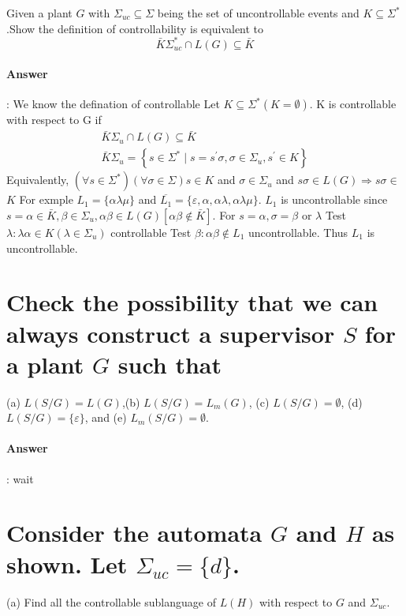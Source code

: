 \documentclass{article}
\begin{document}
Given a plant $G$ with $\Sigma_{u c} \subseteq \Sigma$ being the set of uncontrollable events and $K \subseteq \Sigma^*$.Show the definition of controllability is equivalent to
$$
\bar{K} \Sigma_{u c}^* \cap L(G) \subseteq \bar{K}
$$

\paragraph{Answer}:
We know the defination of controllable Let $K \subseteq \Sigma^*(K=\emptyset)$. K is controllable with respect to $\mathrm{G}$ if
$$
\begin{array}{r}
\bar{K} \Sigma_u \cap L(G) \subseteq \bar{K} \\
\bar{K} \Sigma_u=\left\{s \in \Sigma^* \mid s=s^{\prime} \sigma, \sigma \in \Sigma_u, s^{\prime} \in K\right\}
\end{array}
$$
Equivalently, $\left(\forall s \in \Sigma^*\right)(\forall \sigma \in \Sigma) s \in K$ and $\sigma \in \Sigma_u$ and $s \sigma \in L(G) \Rightarrow s \sigma \in$
$K$
For exmple $L_1=\{\alpha \lambda \mu\}$ and $\overline{L_1}=\{\varepsilon, \alpha, \alpha \lambda, \alpha \lambda \mu\}$. $L_1$ is uncontrollable since $s=\alpha \in \bar{K}, \beta \in \Sigma_u, \alpha \beta \in L(G)[\alpha \beta \notin \bar{K}]$. For $s=\alpha, \sigma=\beta$ or $\lambda$
Test $\lambda: \lambda \alpha \in K\left(\lambda \in \Sigma_u\right)$ controllable
Test $\beta: \alpha \beta \notin L_1$ uncontrollable. Thus $L_1$ is uncontrollable.


\section{Check the possibility that we can always construct a supervisor $S$ for a plant $G$ such that}
(a) $L(S / G)=L(G)$,(b) $L(S / G)=L_m(G)$, (c) $L(S / G)=\emptyset$, (d) $L(S / G)=\{\varepsilon\}$, and (e) $L_m(S / G)=\emptyset$.


\paragraph{Answer}:
wait

\section{Consider the automata $G$ and $H$ as shown. Let $\Sigma_{uc} = \{d\}$.}
(a) Find all the controllable sublanguage of $L(H)$ with respect to $G$ and $\Sigma_{u c}$.
\end{document}

